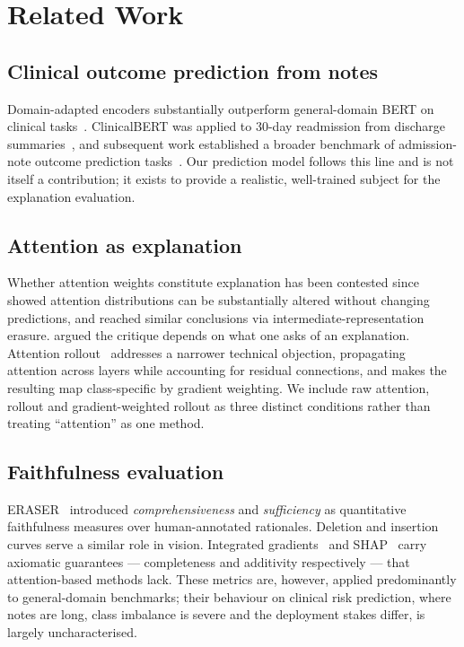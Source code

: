 \documentclass[conference]{IEEEtran}
\begin{document}
\section{Related Work}

\subsection{Clinical outcome prediction from notes}
Domain-adapted encoders substantially outperform general-domain BERT on clinical
tasks~\cite{alsentzer2019,lee2020,gu2021}. ClinicalBERT was applied to 30-day
readmission from discharge summaries~\cite{huang2019}, and subsequent work
established a broader benchmark of admission-note outcome prediction
tasks~\cite{vanaken2021}. Our prediction model follows this line and is not
itself a contribution; it exists to provide a realistic, well-trained subject for
the explanation evaluation.

\subsection{Attention as explanation}
Whether attention weights constitute explanation has been contested since
\cite{jain2019} showed attention distributions can be substantially altered
without changing predictions, and \cite{serrano2019} reached similar conclusions
via intermediate-representation erasure. \cite{wiegreffe2019} argued the critique
depends on what one asks of an explanation. Attention
rollout~\cite{abnar2020} addresses a narrower technical objection, propagating
attention across layers while accounting for residual connections, and
\cite{chefer2021} makes the resulting map class-specific by gradient weighting.
We include raw attention, rollout and gradient-weighted rollout as three distinct
conditions rather than treating ``attention'' as one method.

\subsection{Faithfulness evaluation}
ERASER~\cite{deyoung2020} introduced \emph{comprehensiveness} and
\emph{sufficiency} as quantitative faithfulness measures over human-annotated
rationales. Deletion and insertion curves serve a similar role in vision.
Integrated gradients~\cite{sundararajan2017} and SHAP~\cite{lundberg2017} carry
axiomatic guarantees --- completeness and additivity respectively --- that
attention-based methods lack. These metrics are, however, applied predominantly
to general-domain benchmarks; their behaviour on clinical risk prediction, where
notes are long, class imbalance is severe and the deployment stakes differ, is
largely uncharacterised.
\end{document}
